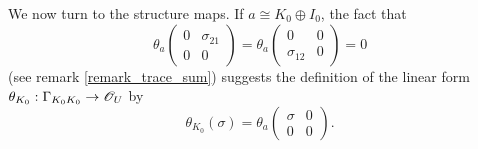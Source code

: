 We now turn to the structure maps. If $a\cong K_0\oplus I_0$, the fact that
$$\theta_a\left (\begin{smallmatrix} 0 & \sigma_{21} \\ 0 & 0 \end{smallmatrix} \right )=\theta_a\left (\begin{smallmatrix} 0 & 0 \\ \sigma_{12} & 0 \end{smallmatrix} \right )=0$$
(see remark \ref{remark_trace_sum}) suggests the definition of the linear form $\theta_{K_0}:\Gamma_{K_0K_0}\to \mathscr{O}_U$ by
$$\theta_{K_0}(\sigma )=\theta_a\left (\begin{smallmatrix} \sigma & 0 \\ 0 & 0 \end{smallmatrix} \right ).$$

